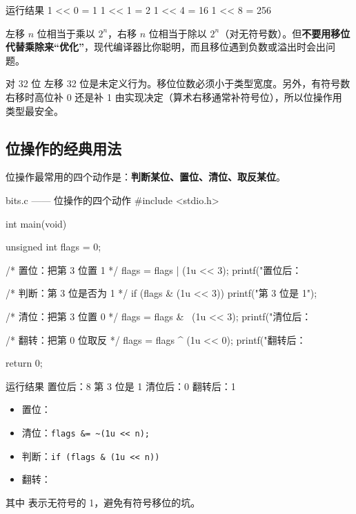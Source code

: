 \begin{outbox}{运行结果}
1 << 0 = 1
1 << 1 = 2
1 << 4 = 16
1 << 8 = 256
\end{outbox}

左移 $n$ 位相当于乘以 $2^n$，右移 $n$ 位相当于除以 $2^n$（对无符号数）。但\textbf{不要用移位代替乘除来“优化”}，现代编译器比你聪明，而且移位遇到负数或溢出时会出问题。

\begin{pitfall}[移位位数不能超过类型宽度]
对 32 位  左移 32 位是未定义行为。移位位数必须小于类型宽度。另外，有符号数右移时高位补 0 还是补 1 由实现决定（算术右移通常补符号位），所以位操作用  类型最安全。
\end{pitfall}

\subsection{位操作的经典用法}

位操作最常用的四个动作是：\textbf{判断某位、置位、清位、取反某位}。

\begin{codebox}{bits.c —— 位操作的四个动作}
#include <stdio.h>

int main(void)
{
    unsigned int flags = 0;

    /* 置位：把第 3 位置 1 */
    flags = flags | (1u << 3);
    printf("置位后：%

    /* 判断：第 3 位是否为 1 */
    if (flags & (1u << 3)) {
        printf("第 3 位是 1\n");
    }

    /* 清位：把第 3 位置 0 */
    flags = flags & ~(1u << 3);
    printf("清位后：%

    /* 翻转：把第 0 位取反 */
    flags = flags ^ (1u << 0);
    printf("翻转后：%

    return 0;
}
\end{codebox}

\begin{outbox}{运行结果}
置位后：8
第 3 位是 1
清位后：0
翻转后：1
\end{outbox}

\begin{tipbox}[记住这四个式子]
\begin{itemize}
  \item 置位：
  \item 清位：\texttt{flags \&= \textasciitilde{}(1u << n);}
  \item 判断：\texttt{if (flags \& (1u << n))}
  \item 翻转：
\end{itemize}
其中  表示无符号的 1，避免有符号移位的坑。
\end{tipbox}

